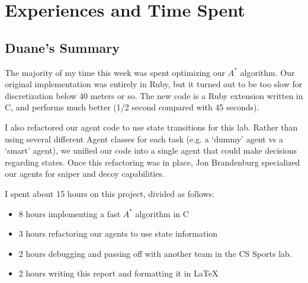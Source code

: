 \chapter{Experiences and Time Spent}\label{chap:exp}
\section{Duane's Summary}
The majority of my time this week was spent optimizing our $A^*$ algorithm.  Our original implementation was entirely in Ruby, but it turned out to be too slow for discretization below 40 meters or so.  The new code is a Ruby extension written in C, and performs much better (1/2 second compared with 45 seconds).
\par
I also refactored our agent code to use state transitions for this lab.  Rather than using several different Agent classes for each task (e.g. a `dummy' agent vs a `smart' agent), we unified our code into a single agent that could make decisions regarding states.  Once this refactoring was in place, Jon Brandenburg specialized our agents for sniper and decoy capabilities.
\par
I spent about 15 hours on this project, divided as follows:
\begin{itemize}
    \item 8 hours implementing a fast $A^*$ algorithm in C
    \item 3 hours refactoring our agents to use state information
    \item 2 hours debugging and passing off with another team in the CS Sports lab.
    \item 2 hours writing this report and formatting it in \LaTeX
\end{itemize}

